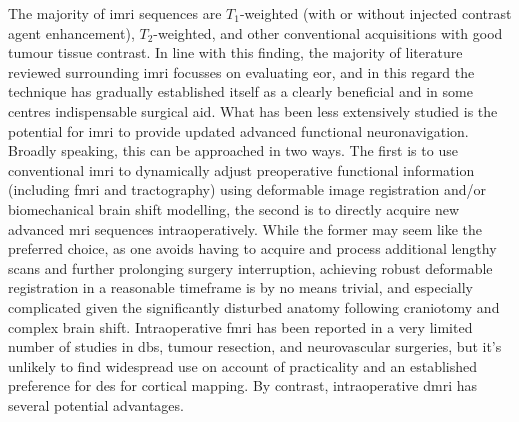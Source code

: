 
The majority of \gls{imri} sequences are $T_1$-weighted (with or without injected contrast agent enhancement), $T_2$-weighted, and other conventional acquisitions with good tumour tissue contrast\autocite{Kubben2011,Coburger2019}.
In line with this finding, the majority of literature reviewed surrounding \gls{imri} focusses on evaluating \gls{eor}, and in this regard the technique has gradually established itself as a clearly beneficial and in some centres indispensable surgical aid\autocite{Garzon-Muvdi2019,Hlavac2020}.
What has been less extensively studied is the potential for \gls{imri} to provide updated advanced functional neuronavigation.
Broadly speaking, this can be approached in two ways.
The first is to use conventional \gls{imri} to dynamically adjust preoperative functional information (including \gls{fmri} and tractography) using deformable image registration and/or biomechanical brain shift modelling, the second is to directly acquire new advanced \gls{mri} sequences intraoperatively.
While the former may seem like the preferred choice, as one avoids having to acquire and process additional lengthy scans and further prolonging surgery interruption, achieving robust deformable registration in a reasonable timeframe is by no means trivial, and especially complicated given the significantly disturbed anatomy following craniotomy and complex brain shift.
Intraoperative \gls{fmri} has been reported in a very limited number of studies in \gls{dbs}\autocite{Hiss2015,Knight2015}, tumour resection\autocite{Roder2016a,Qiu2017a}, and neurovascular\autocite{Muscas2019} surgeries, but it's unlikely to find widespread use on account of practicality and an established preference for \gls{des} for cortical mapping.
By contrast, intraoperative \gls{dmri} has several potential advantages.


